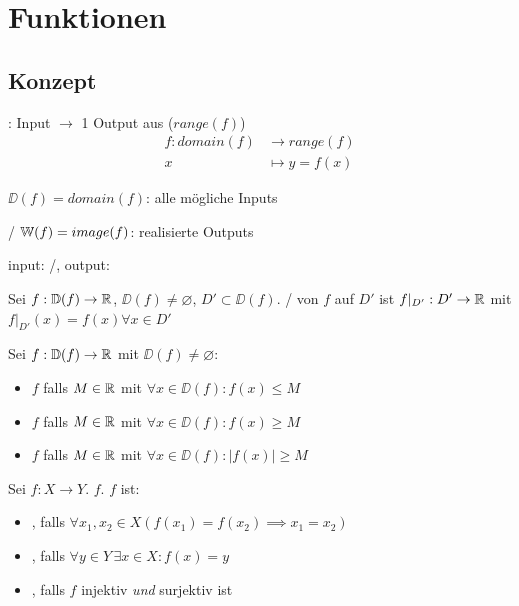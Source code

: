 \section{Funktionen}

\subsection{Konzept}

\Def {}: Input $\to$ 1 Output aus  ($range(f)$)
\begin{align*}
    f: domain(f) & \to range(f) \\
    x & \mapsto y = f(x)
\end{align*}

\Def {} $\DD(f) = domain(f)$: alle mögliche Inputs

\Def {}/ $\mathbb{W}(f) = image(f)$: realisierte Outputs

\Def input: /, output: 

\Def Sei $f: \mathbb{D}(f) \to \mathbb{R}$, $\DD(f)\ne \varnothing$, $D' \subset \DD(f)$.
/ von $f$ auf $D'$ ist $f\rvert_{D'} : D' \to \mathbb{R}$
mit $f\rvert_{D'}(x) = f(x) \forall x \in D'$

\Def Sei $f : \mathbb{D}(f) \to \mathbb{R}$ mit $\DD(f)\ne \varnothing$:
\vspace{-0.6em}
\begin{itemize}
    \item $f$  falls $M \in \mathbb{R}$ mit $\forall x \in \DD(f) : f(x)\le M$
    \item $f$  falls $M \in \mathbb{R}$ mit $\forall x \in \DD(f) : f(x)\ge M$
    \item $f$  falls $M \in \mathbb{R}$ mit $\forall x \in \DD(f) : |f(x)|\ge M$
\end{itemize}

\Def Sei $f : X \to Y$. $f$. $f$ ist:
\vspace{-0.6em}
\begin{itemize}
    \item {}, falls $\forall x_1, x_2 \in X (f(x_1) = f(x_2) \implies x_1 = x_2)$
    \item {}, falls $\forall y \in Y \, \exists x \in X : f(x) = y$
    \item {}, falls $f$ injektiv \textit{und} surjektiv ist
\end{itemize}

